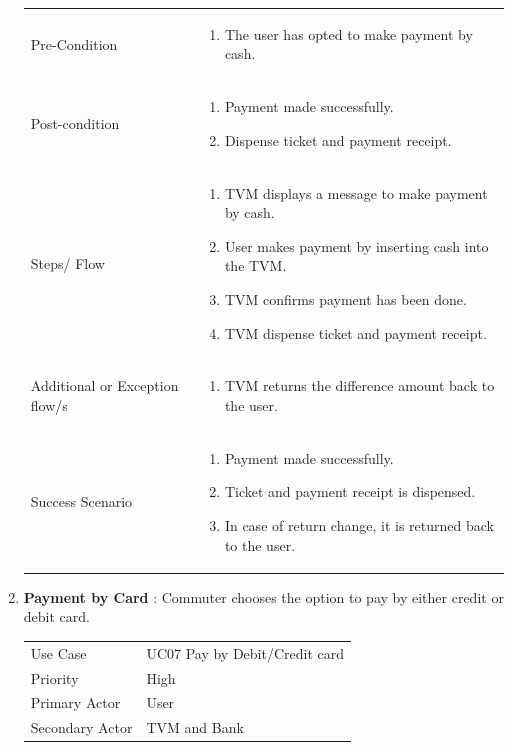 \documentclass[15pt]{article}
\begin{document}
\begin{enumerate}[leftmargin=2em, itemsep=0pt, parsep=0pt, , font=\Large\bfseries]
\begin{tabularx}{1\textwidth} { 
  | >{\raggedright\arraybackslash}X 
  | >{\raggedright\arraybackslash}X 
  | }
 Pre-Condition  & 
 \begin{enumerate}
  \item The user has opted to make payment by cash.
  \end{enumerate}
  \\
  
   Post-condition  & \begin{enumerate}
  \item Payment made successfully.
  \item Dispense ticket and payment receipt.
  \end{enumerate}
  \\
  
  Steps/ Flow  & \begin{enumerate}
  \item TVM displays a message to make payment by cash.
  \item User makes payment by inserting cash into the TVM.
  \item TVM confirms payment has been done.
  \item TVM dispense ticket and payment receipt.
  \end{enumerate}
  \\
  
   Additional or Exception flow/s  & \begin{enumerate}
  \item  TVM returns the difference amount back to the user. 
  \end{enumerate}
  \\
    
   Success Scenario  & \begin{enumerate}
  \item Payment made successfully.
  \item Ticket and payment receipt is dispensed.
  \item In case of return change, it is returned back to the user.
  \end{enumerate}
  \\

\hline
\end{tabularx}


\newpage
\item {\Large\bfseries{Payment by Card}} : Commuter chooses the option to pay by either credit or debit card.
\newline
\begin{xltabular}{1\textwidth} { 
  | >{\raggedright\arraybackslash}X 
  | >{\raggedright\arraybackslash}X 
  | }
 \hline
 Use Case &  UC07 Pay by Debit/Credit card \\
 Priority & High \\
 Primary Actor  & User \\
 Secondary Actor  & TVM and Bank \\


\end{xltabular}
\end{enumerate}
\end{document}
